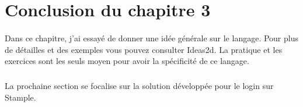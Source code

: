 \section{Conclusion du chapitre 3}
\paragraph{}
Dans ce chapitre, j'ai essayé de donner une idée générale sur le langage. Pour plus de détailles et des exemples vous pouvez consulter Ideas2d. 
La pratique et les exercices sont les seuls moyen pour avoir la spécificité de ce langage.
\subparagraph{}
La prochaine section se focalise sur la solution développée pour le login sur Stample.







